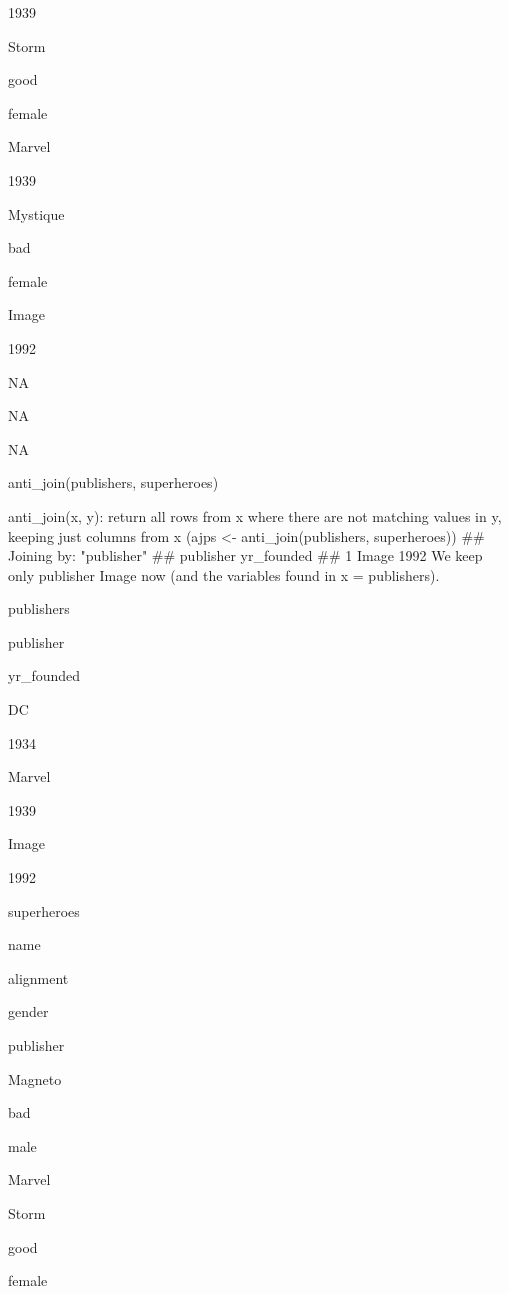 1939
 
Storm
 
good
 
female
 


Marvel
 
1939
 
Mystique
 
bad
 
female
 


Image
 
1992
 
NA
 
NA
 
NA
 



anti_join(publishers, superheroes)
 

anti_join(x, y): return all rows from x where there are not matching values in y, keeping just columns from x
 (ajps <- anti_join(publishers, superheroes)) ## Joining by: "publisher" ##   publisher yr_founded
## 1     Image       1992 
We keep only publisher Image now (and the variables found in x = publishers).
 



publishers
 


publisher
 
yr_founded
 



DC
 
1934
 


Marvel
 
1939
 


Image
 
1992
 


superheroes
 


name
 
alignment
 
gender
 
publisher
 



Magneto
 
bad
 
male
 
Marvel
 


Storm
 
good
 
female
 
